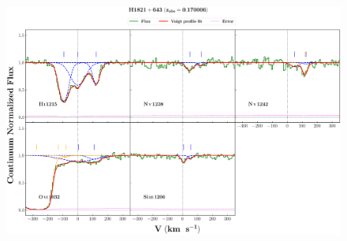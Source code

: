 \documentclass[12pt]{report}
\begin{document}
\newpage

\begin{landscape}

\begin{figure}
    \centering
    \vspace{-20mm}
    \hspace*{-35mm}
    \includegraphics[width=1.25\linewidth]{System-Plots/H1821+643_z=0.170006_sys_plot.png}
\end{figure}

\end{landscape}
\end{document}
